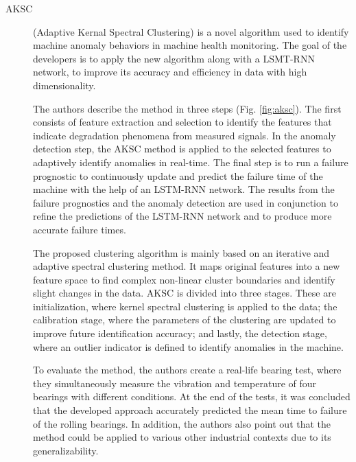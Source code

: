 \begin{description}
    \item[AKSC]\cite{Cheng.Zhu.ea_MachineHealthMonitoring_2019} (Adaptive Kernal Spectral Clustering) is a novel algorithm used to identify machine anomaly behaviors in machine health monitoring. The goal of the developers is to apply the new algorithm along with a LSMT-RNN network, to improve its accuracy and efficiency in data with high dimensionality. 
    
    The authors describe the method in three steps (Fig. \ref{fig:aksc}). The first consists of feature extraction and selection to identify the features that indicate degradation phenomena from measured signals. In the anomaly detection step, the AKSC method is applied to the selected features to adaptively identify anomalies in real-time. The final step is to run a failure prognostic to continuously update and predict the failure time of the machine with the help of an LSTM-RNN network. The results from the failure prognostics and the anomaly detection are used in conjunction to refine the predictions of the LSTM-RNN network and to produce more accurate failure times.

    The proposed clustering algorithm is mainly based on an iterative and adaptive spectral clustering method. It maps original features into a new feature space to find complex non-linear cluster boundaries and identify slight changes in the data. AKSC is divided into three stages. These are initialization, where kernel spectral clustering is applied to the data; the calibration stage, where the parameters of the clustering are updated to improve future identification accuracy; and lastly, the detection stage, where an outlier indicator is defined to identify anomalies in the machine. 

    To evaluate the method, the authors create a real-life bearing test, where they simultaneously measure the vibration and temperature of four bearings with different conditions. At the end of the tests, it was concluded that the developed approach accurately predicted the mean time to failure of the rolling bearings. In addition, the authors also point out that the method could be applied to various other industrial contexts due to its generalizability.
\end{description}

